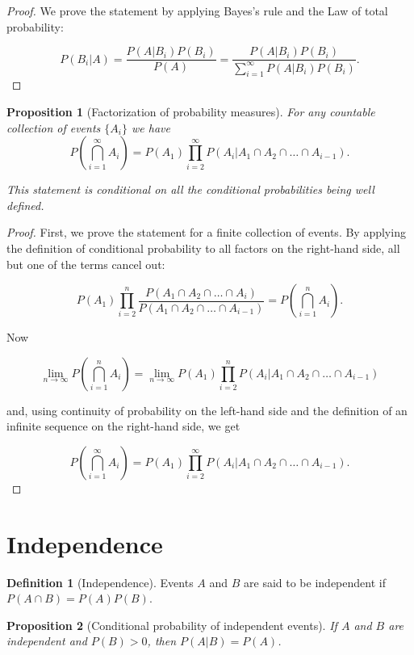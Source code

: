 \documentclass{book}
\theoremstyle{plain}%
\newtheorem{proposition}{Proposition}[section]
\theoremstyle{definition}
\newtheorem{definition}{Definition}[section]
\newlength{\arrow}
\begin{document}
\begin{proof}
We prove the statement by applying Bayes's rule and the Law of total probability:

$$P(B_i|A) = \frac{P(A|B_i)P(B_i)}{P(A)} = \frac{P(A|B_i)P(B_i)}{\sum_{i=1}^\infty P(A|B_i)P(B_i)}.$$
\end{proof}

\begin{proposition}[Factorization of probability measures] For any countable collection of events $\{A_i\}$ we have $$ P(\bigcap_{i=1}^\infty A_i) = P(A_1) \prod_{i=2}^\infty P(A_i | A_1 \cap A_2 \cap \dots \cap A_{i-1}).$$

This statement is conditional on all the conditional probabilities being well defined.
\end{proposition}

\begin{proof}
First, we prove the statement for a finite collection of events. By applying the definition of conditional probability to all factors on the right-hand side, all but one of the terms cancel out:

$$P(A_1) \prod_{i=2}^n \frac{P(A_1 \cap A_2 \cap \dots \cap A_{i})}{P(A_1 \cap A_2 \cap \dots \cap A_{i-1})} = P(\bigcap_{i=1}^n A_i).$$

Now

$$\lim_{n \rightarrow \infty} P(\bigcap_{i=1}^n A_i) = \lim_{n \rightarrow \infty} P(A_1) \prod_{i=2}^n P(A_i | A_1 \cap A_2 \cap \dots \cap A_{i-1})$$

and, using continuity of probability on the left-hand side and the definition of an infinite sequence on the right-hand side, we get

$$P(\bigcap_{i=1}^\infty A_i) = P(A_1) \prod_{i=2}^\infty P(A_i | A_1 \cap A_2 \cap \dots \cap A_{i-1}).$$

\end{proof}


\section{Independence}

\begin{definition}[Independence]
Events $A$ and $B$ are said to be independent if $P(A \cap B) = P(A)P(B)$.
\end{definition}

\begin{proposition}[Conditional probability of independent events]
If $A$ and $B$ are independent and $P(B) > 0$, then
$P(A|B) = P(A)$.\label{prop:independent}
\end{proposition}
\end{document}
